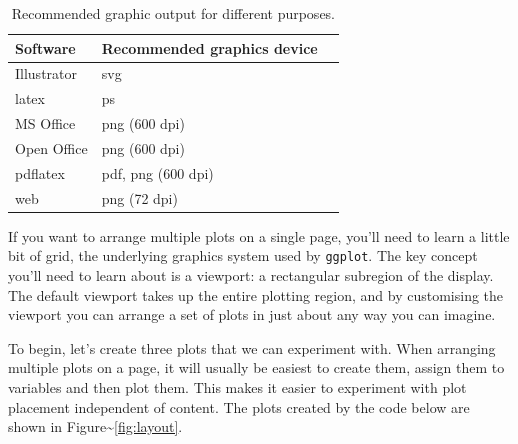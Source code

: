 \begin{table}
  \begin{center}
  \begin{tabular}{lll}
    \toprule
    Software & Recommended graphics device \\
    \midrule
    Illustrator & svg \\
    latex & ps \\
    MS Office & png (600 dpi) \\
    Open Office & png (600 dpi) \\
    pdflatex & pdf, png (600 dpi) \\
    web & png (72 dpi) \\
    \bottomrule 
  \end{tabular}
  \end{center}
  \caption{Recommended graphic output for different purposes.}
  \label{tbl:graphic-recommendation}
\end{table}


If you want to arrange multiple plots on a single page, you'll need to
learn a little bit of grid, the underlying graphics system used by
\texttt{ggplot}. The key concept you'll need to learn about is a
viewport: a rectangular subregion of the display. The default viewport
takes up the entire plotting region, and by customising the viewport you
can arrange a set of plots in just about any way you can imagine.
 

To begin, let's create three plots that we can experiment with. When
arranging multiple plots on a page, it will usually be easiest to create
them, assign them to variables and then plot them. This makes it easier
to experiment with plot placement independent of content. The plots
created by the code below are shown in
Figure\textasciitilde{}\ref{fig:layout}.

\begin{Shaded}
\begin{Highlighting}[]
\StringTok{ }  \NormalTok{))}
\end{Highlighting}
\end{Shaded}

